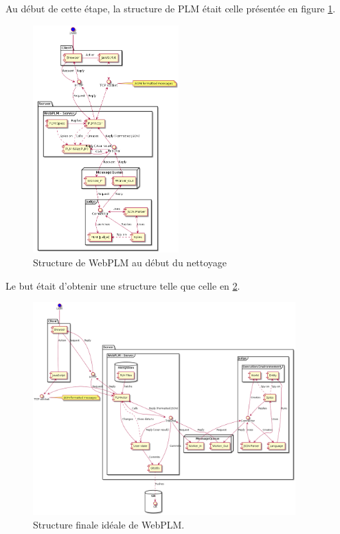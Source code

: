 \documentclass[stage]{tnreport}
\begin{document}
Au début de cette étape, la structure de PLM était celle présentée en figure \ref{fig:wplmUP3}.
\begin{figure}[h!]
	\centering
		\includegraphics[width=0.5\textwidth]{figures/WebPLM-uml-cp3}
	\caption{Structure de WebPLM au début du nettoyage}
	\label{fig:wplmUP3}
\end{figure}

Le but était d'obtenir une structure telle que celle en \ref{fig:wplmUP4}.

\begin{figure}[h]
	\centering
		\includegraphics[width=0.9\textwidth]{figures/WebPLM-uml-cp4}
	\caption{Structure finale idéale de WebPLM.}
	\label{fig:wplmUP4}
\end{figure}
\end{document}
